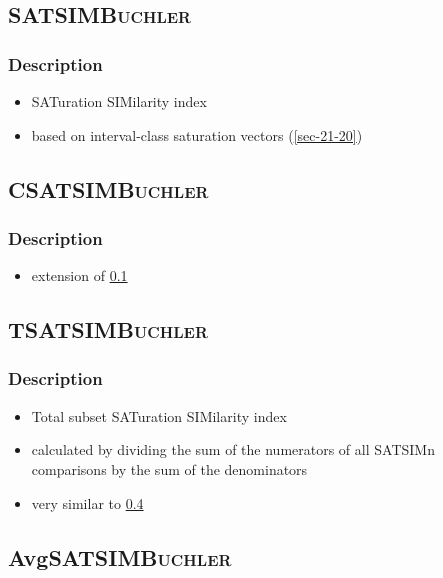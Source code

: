 \documentclass[11pt]{article}
\begin{document}
\subsection{SATSIM\hfill{}\textsc{Buchler}}
\label{sec-3-22}
\subsubsection{Description}
\label{sec-3-22-1}
\begin{itemize}
\item SATuration SIMilarity index
\item based on interval-class saturation vectors (\ref{sec-21-20})
\end{itemize}

\subsection{CSATSIM\hfill{}\textsc{Buchler}}
\label{sec-3-23}
\subsubsection{Description}
\label{sec-3-23-1}
\begin{itemize}
\item extension of \ref{sec-3-22}
\end{itemize}

\subsection{TSATSIM\hfill{}\textsc{Buchler}}
\label{sec-3-24}
\subsubsection{Description}
\label{sec-3-24-1}
\begin{itemize}
\item Total subset SATuration SIMilarity index
\item calculated by dividing the sum of the numerators of all SATSIMn
comparisons by the sum of the denominators
\item very similar to \ref{sec-3-25}
\end{itemize}

\subsection{AvgSATSIM\hfill{}\textsc{Buchler}}
\label{sec-3-25}
\end{document}
